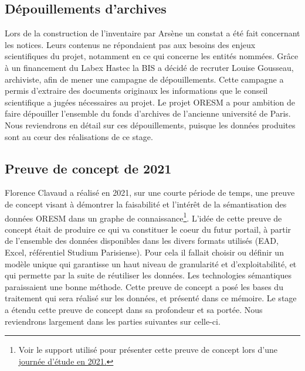 \subsection{Dépouillements d'archives}
Lors de la construction de l'inventaire par Arsène un constat a été fait concernant les notices. Leurs contenus ne répondaient pas aux besoins des enjeux scientifiques du projet, notamment en ce qui concerne les entités nommées. Grâce à un financement du Labex Hastec la BIS a décidé de recruter Louise Gousseau, archiviste, afin de mener une campagne de dépouillements. Cette campagne a permis d'extraire des documents originaux les informations que le conseil scientifique a jugées nécessaires au projet. Le projet ORESM a pour ambition de faire dépouiller l'ensemble du fonds d'archives de l'ancienne université de Paris. Nous reviendrons en détail sur ces dépouillements, puisque les données produites sont au cœur des réalisations de ce stage.
\subsection{Preuve de concept de 2021}
Florence Clavaud a réalisé en 2021, sur une courte période de temps, une preuve de concept visant à démontrer la faisabilité et l'intérêt de la sémantisation des données ORESM dans un graphe de connaissance\footnote{Voir le support utilisé pour présenter cette preuve de concept lors d'une \href{https://oresm.hypotheses.org/files/2022/03/ORESM_JE_26112021_JFMoufflet_FClavaud-3.pdf}{journée d'étude en 2021.}}.  L'idée de cette preuve de concept était de produire ce qui va constituer le coeur du futur portail, à partir de l'ensemble des données disponibles dans les divers formats utilisés (EAD, Excel, référentiel Studium Parisiense). Pour cela il fallait choisir ou définir un modèle unique qui garantisse un haut niveau de granularité et d'exploitabilité, et qui permette par la suite de réutiliser les données. Les technologies sémantiques paraissaient une bonne méthode. Cette preuve de concept a posé les bases du traitement qui sera réalisé sur les données, et présenté dans ce mémoire. Le stage a étendu cette preuve de concept dans sa profondeur et sa portée. Nous reviendrons largement dans les parties suivantes sur celle-ci.